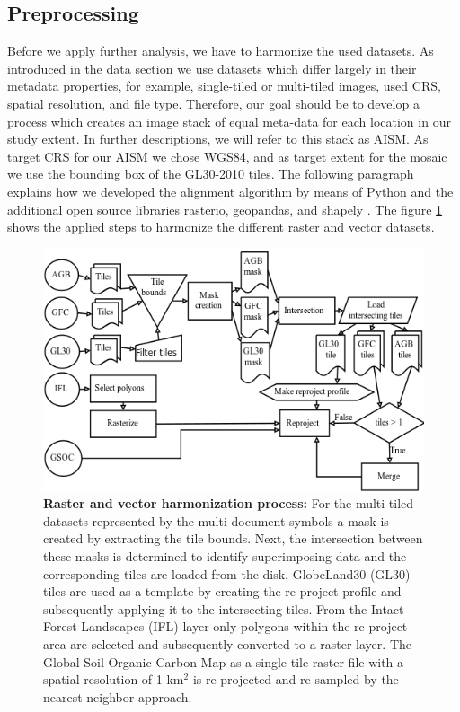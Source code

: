 	\subsection{Preprocessing}
		Before we apply further analysis, we have to harmonize the used datasets. As introduced in the data section we use datasets which differ largely in their metadata properties, for example, single-tiled or multi-tiled images, used \ac{CRS}, spatial resolution, and file type. Therefore, our goal should be to develop a process which creates an image stack of equal meta-data for each location in our study extent. In further descriptions, we will refer to this stack as \ac{AISM}. As target \ac{CRS} for our \ac{AISM} we chose \ac{WGS84}, and as target extent for the mosaic we use the bounding box of the \ac{GL30}-2010 tiles. The following paragraph explains how we developed the alignment algorithm by means of Python and the additional open source libraries rasterio, geopandas, and shapely \citep{Rossum2018,McKinney2010}. The figure \ref{fig:preprocessing_flowchart} shows the applied steps to harmonize the different raster and vector datasets.
		\begin{figure}[ht]
			\centering
			\includegraphics[scale=.97]{img/align}
			\caption[Raster and vector harmonization process]{\textbf{Raster and vector harmonization process:} For the multi-tiled datasets represented by the multi-document symbols a mask is created by extracting the tile bounds. Next, the intersection between these masks is determined to identify superimposing data and the corresponding tiles are loaded from the disk. GlobeLand30 (GL30) tiles are used as a template by creating the re-project profile and subsequently applying it to the intersecting tiles. From the Intact Forest Landscapes (IFL) layer only polygons within the re-project area are selected and subsequently converted to a raster layer. The Global Soil Organic Carbon Map as a single tile raster file with a spatial resolution of 1 km$^2$ is re-projected and re-sampled by the nearest-neighbor approach.}
			\label{fig:preprocessing_flowchart}
		\end{figure}

